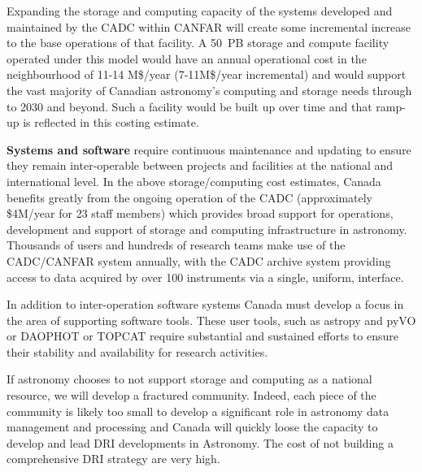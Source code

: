 \documentclass[11pt]{article}
\begin{document}
\begin{lrptextbox}
Expanding the storage and computing capacity of the systems developed and maintained by the CADC within CANFAR will create some incremental increase to the base operations of that facility.   A 50~PB storage and compute facility operated under this model would have an annual operational cost in the neighbourhood of 11-14 M\$/year (7-11M\$/year incremental) and would support the vast majority of Canadian astronomy's computing and storage needs through to 2030 and beyond.  Such a facility would be built up over time and that  ramp-up is reflected in this costing estimate.

{\bf Systems and software} require continuous maintenance and updating to ensure they remain inter-operable between projects and facilities at the national and international level.  In the above storage/computing cost estimates, Canada benefits greatly from the ongoing operation of the CADC (approximately \$4M/year for 23 staff members) which provides broad support for operations, development and support of storage and computing infrastructure in astronomy.  Thousands of users and hundreds of research teams make use of the CADC/CANFAR system annually, with the CADC archive system providing access to data acquired by over 100 instruments via a single, uniform, interface.   

In addition to inter-operation software systems Canada must develop a focus in the area of supporting software tools.  These user tools, such as astropy and pyVO or DAOPHOT or TOPCAT require substantial and sustained efforts to ensure their stability and availability for research activities.

If astronomy chooses to not support storage and computing as a national resource, we will develop a fractured community.  Indeed, each piece of the community is likely too small to develop a significant role in astronomy data management and processing and Canada will quickly loose the capacity to develop and lead DRI developments in Astronomy.  The cost of not building a comprehensive DRI strategy are very high.

\end{lrptextbox}
\end{document}
